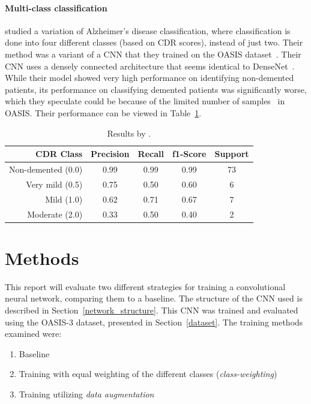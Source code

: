 \documentclass{kththesis}
\begin{document}
\subsubsection{Multi-class classification}
\textcite{islam2018early} studied a variation of Alzheimer's disease classification, where classification is done into four different classes (based on CDR scores), instead of just two. Their method was a variant of a CNN that they trained on the OASIS dataset~\cite{oasis}. Their CNN uses a densely connected architecture that seems identical to DenseNet~\cite{huang2017densely}. While their model showed very high performance on identifying non-demented patients, its performance on classifying demented patients was significantly worse, which they speculate could be because of the limited number of samples~\cite{islam2018early} in OASIS\@. Their performance can be viewed in Table~\ref{tab:results_islam_zhang}.

\begin{table}
  \begin{center}
    \caption{Results by \textcite{islam2018early}. \label{tab:results_islam_zhang}}
    \begin{tabular}{r|ccc|c}
      \textbf{CDR Class} & \textbf{Precision} & \textbf{Recall} & \textbf{f1-Score} & \textbf{Support} \\
      \toprule
      Non-demented (0.0) & 0.99 & 0.99 & 0.99 & 73 \\
      Very mild (0.5) & 0.75 & 0.50 & 0.60 & 6  \\
      Mild (1.0)         & 0.62 & 0.71 & 0.67 & 7  \\
      Moderate (2.0)     & 0.33 & 0.50 & 0.40 & 2   \\
    \end{tabular}
  \end{center}
\end{table}

\chapter{Methods} \label{methods}
This report will evaluate two different strategies for training a convolutional neural network, comparing them to a baseline. The structure of the CNN used is described in Section~\ref{network_structure}. This CNN was trained and evaluated using the OASIS-3 dataset, presented in Section~\ref{dataset}. The training methods examined were:
\begin{enumerate}
  \item Baseline
  \item Training with equal weighting of the different classes (\textit{class-weighting})
  \item Training utilizing \textit{data augmentation}
\end{enumerate}
\end{document}
